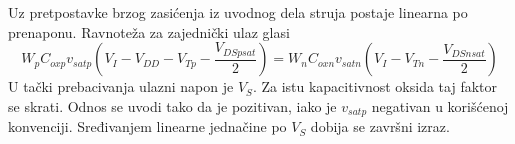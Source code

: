 Uz pretpostavke brzog zasićenja iz uvodnog dela struja postaje linearna po prenaponu. Ravnoteža za zajednički ulaz glasi
\[W_pC_{oxp}v_{satp}\left(V_I-V_{DD}-V_{Tp}-\frac{V_{DSpsat}}2\right)=W_nC_{oxn}v_{satn}\left(V_I-V_{Tn}-\frac{V_{DSnsat}}2\right)\]
U tački prebacivanja ulazni napon je $V_S$. Za istu kapacitivnost oksida taj faktor se skrati. Odnos se uvodi tako da je pozitivan, iako je $v_{satp}$ negativan u korišćenoj konvenciji. Sređivanjem linearne jednačine po $V_S$ dobija se završni izraz.
